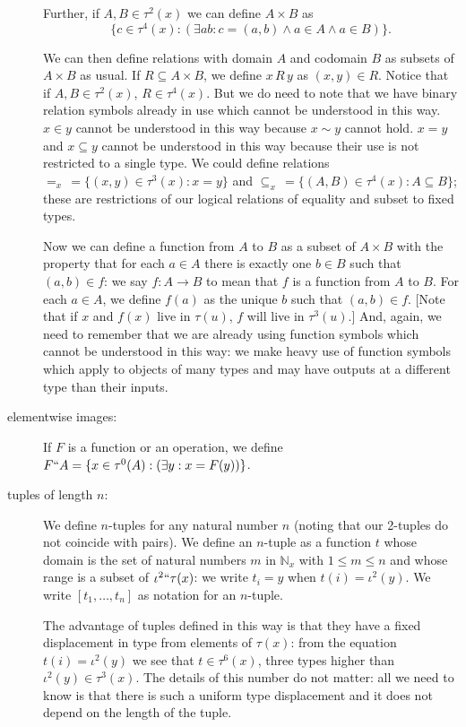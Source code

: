 \documentclass[12pt]{article}
\begin{document}
\begin{description}
Further, if $A, B \in \tau^2(x)$ we can define $A \times B$ as $$\{c \in \tau^4(x):(\exists ab:c=(a,b) \wedge a \in A \wedge a \in B)\}.$$

We can then define relations with domain $A$ and codomain $B$ as subsets of $A \times B$ as usual.  If $R \subseteq A \times B$, we define $x \, R \, y$ as $(x,y)\in R$.  Notice that if $A,B \in \tau^2(x)$, $R \in \tau^4(x)$.  But we do need to note
that we have binary relation symbols already in use which cannot be understood in this way.  $x \in y$ cannot be understood in this way because $x \sim y$ cannot hold.  $x=y$ and $x \subseteq y$ cannot be understood in this way because their use is not restricted to a single type.  We could define relations $=_x \, = \{(x,y) \in \tau^3(x):x=y\}$ and $\subseteq_x \, = \{(A,B) \in \tau^4(x):A \subseteq B\}$;  these are restrictions of our logical relations of equality and subset to fixed types.

Now we can define a function from $A$ to $B$ as a subset of $A \times B$ with the property that for each $a \in A$ there is exactly one $b \in B$ such that $(a,b) \in f$:  we say $f:A \rightarrow B$ to mean that $f$ is a function from $A$ to $B$.  For each $a \in A$, we define $f(a)$ as the unique $b$ such that $(a,b)\in f$.  [Note that if $x$ and $f(x)$ live in $\tau(u)$,  $f$ will live in $\tau^3(u)$.]  And, again, we need to remember that we are already using function symbols which cannot be understood in this way:  we make heavy use of function symbols which apply to objects of many types and may have outputs at a different type than their inputs.

\item[elementwise images:]  If $F$ is a function or an operation, we define $F``A = \{x\in \tau^0(A):(\exists y: x = F(y))\}$.

\item[tuples of length $n$:]  We define $n$-tuples for any natural number $n$ (noting that our 2-tuples do not coincide with pairs).  We define an $n$-tuple as a function $t$ whose domain is the set of  natural numbers $m$ in $\mathbb N_x$ 
with $1 \leq m \leq n$ and whose range is a subset of $\iota^2``\tau(x)$:  we write $t_i = y$ when $t(i) = \iota^2(y)$.
We write $[t_1,\ldots,t_n]$ as notation for an $n$-tuple.

The advantage of tuples defined in this way is that they have a fixed displacement in type from elements of $\tau(x)$:
from the equation $t(i) = \iota^2(y)$ we see that $t \in \tau^6(x)$, three types higher than $\iota^2(y)\in \tau^3(x)$.  The details of this number do not matter:  all we need to know is that there is such a uniform type displacement and it does not depend on the length of the tuple.


\end{description}
\end{document}
